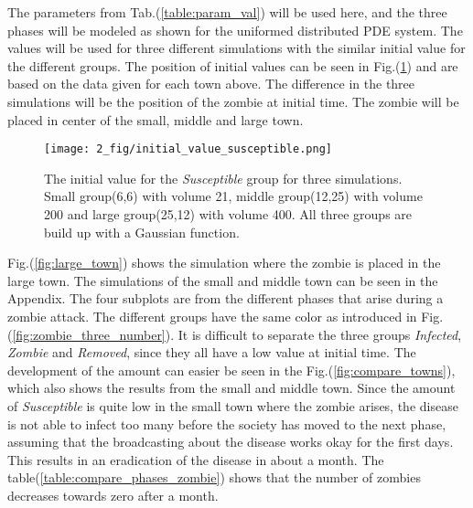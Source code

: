 \documentclass[%
twoside,                 %
final,                   %
chapterprefix=true,      %
open=right               %
10pt]{book}
\begin{document}
\noindent


\vspace{3mm}




\vspace{3mm}


The parameters from Tab.(\ref{table:param_val}) will be used here, and the three phases will be modeled as shown for the uniformed distributed PDE system. The values will be used for three different simulations with the similar initial value for the different groups. The position of initial values can be seen in Fig.(\ref{fig:initial_value_susceptible}) and are based on the data given for each town above. The difference in the three simulations will be the position of the zombie at initial time. The zombie will be placed in center of the small, middle and large town.


\begin{figure}[ht]
  \centerline{\texttt{[image: 2\_fig/initial\_value\_susceptible.png]}}
  \caption{
  \label{fig:initial_value_susceptible} The initial value for the \emph{Susceptible} group for three simulations. Small group(6,6) with volume 21, middle group(12,25) with volume 200 and large group(25,12) with volume 400. All three groups are build up with a Gaussian function.
  }
\end{figure}




\vspace{3mm}




\vspace{3mm}


Fig.(\ref{fig:large_town}) shows the simulation where the zombie is placed in the large town. The simulations of the small and middle town can be seen in the Appendix. The four subplots are from the different phases that arise during a zombie attack. The different groups have the same color as introduced in Fig.(\ref{fig:zombie_three_number}). It is difficult to separate the three groups \emph{Infected}, \emph{Zombie} and \emph{Removed}, since they all have a low value at initial time. The development of the amount can easier be seen in the Fig.(\ref{fig:compare_towns}), which also shows the results from the small and middle town. Since the amount of \emph{Susceptible} is quite low in the small town where the zombie arises, the disease is not able to infect too many before the society has moved to the next phase, assuming that the broadcasting about the disease works okay for the first days. This results in an eradication of the disease in about a month. The table(\ref{table:compare_phases_zombie}) shows that the number of zombies decreases towards zero after a month. 
\end{document}
